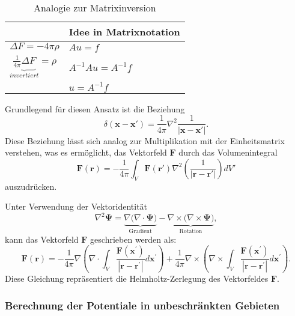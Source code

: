 \begin{table}
\centering
\begin{tabular}{l|l}
  & Idee in Matrixnotation \\
\hline
$\Delta F = -4 \pi \rho$  & $Au = f$ \\
$\underbrace{\frac{1}{4 \pi} \Delta F}_{invertiert} = \rho$ & $A^{-1}Au = A^{-1}f$  \\
 & $u = A^{-1}f$  \\
 \hline
\end{tabular}
\caption{Analogie zur Matrixinversion}
\label{tab:helmholtz_matrix_analogie}
\end{table}

Grundlegend für diesen Ansatz ist die Beziehung
\begin{equation}
\delta (\boldsymbol{x} - \boldsymbol{x'}) = \frac{1}{4 \pi} \nabla^2 \frac{1}{|\boldsymbol{x} - \boldsymbol{x'}|}.
\label{helmholtz:dirac}
\end{equation}
Diese Beziehung lässt sich analog zur Multiplikation mit der Einheitsmatrix verstehen, was es ermöglicht, das Vektorfeld $\boldsymbol{F}$ durch das Volumenintegral
\begin{equation}
\boldsymbol{F}(\boldsymbol{r}) = -\frac{1}{4\pi} \int_V \boldsymbol{F}(\boldsymbol{r}') \nabla^2 \left( \frac{1}{|\boldsymbol{r} - \boldsymbol{r}'|} \right) dV'
\end{equation}
auszudrücken.

Unter Verwendung der Vektoridentität
\begin{equation}
\nabla^2 \boldsymbol{\Psi}= \underbrace{\nabla \Big( \nabla \cdot \boldsymbol{\Psi} \Big)}_{\text{Gradient}} -\underbrace{\nabla \times \Big(\nabla \times \boldsymbol{\Psi} \Big)}_{\text{Rotation}},
\end{equation}
kann das Vektorfeld $\boldsymbol{F}$ geschrieben werden als:
\begin{equation}
\boldsymbol{F}(\boldsymbol{r}) = - \frac{1}{4 \pi} \nabla ( \nabla \cdot \int_V \frac{\boldsymbol{F}(\boldsymbol{x}^{\prime})}{|\boldsymbol{r} - \boldsymbol{r}^{\prime}|} d\boldsymbol{x}^{\prime} ) + \frac{1}{4 \pi} \nabla \times ( \nabla \times \int_V \frac{\boldsymbol{F}(\boldsymbol{x}^{\prime})}{|\boldsymbol{r} - \boldsymbol{r}^{\prime}|} d\boldsymbol{x}^{\prime} ).
\end{equation}
Diese Gleichung repräsentiert die Helmholtz-Zerlegung des Vektorfeldes $\boldsymbol{F}$.

\subsubsection{Berechnung der Potentiale in unbeschränkten Gebieten}


